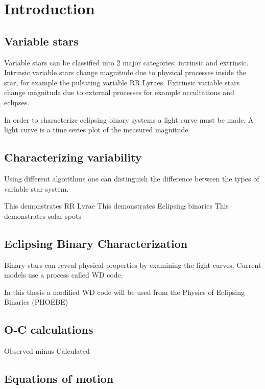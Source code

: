 \chapter{Introduction}\label{ch:intro}

\section{}

\section{Variable stars}
Variable stars can be classified into 2 major categories: intrinsic and extrinsic.
Intrinsic variable stars change magnitude due to physical processes inside the star, for example the pulsating variable RR Lyraes.
Extrinsic variable stars change magnitude due to external processes for example occultations and eclipses.

In order to characterize eclipsing binary systems a light curve must be made.
A light curve is a time series plot of the measured magnitude.

\section{Characterizing variability}
Using different algorithms one can distinguish the difference between the types of variable star system.

This demonstrates RR Lyrae
This demonstrates Eclipsing binaries
This demonstrates solar spots



\section{Eclipsing Binary Characterization}
Binary stars can reveal physical properties by examining the light curves.
Current models use a process called WD code.

In this thesis a modified WD code will be used from the Physics of Eclipsing Binaries (PHOEBE)

\section{O-C calculations}
Observed minus Calculated


\section{Equations of motion}



